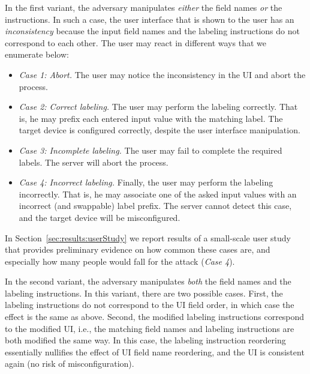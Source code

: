 \label{sec:securityAnalysis_IK:cases}
In the first variant, the adversary manipulates \emph{either} the field names \emph{or} the instructions. In such a case, the user interface that is shown to the user has an \emph{inconsistency} because the input field names and the labeling instructions do not correspond to each other. The user may react in different ways that we enumerate below:
\begin{itemize}
    \item \emph{Case 1: Abort.} The user may notice the inconsistency in the UI and abort the process. \label{detect}
    
    \item \emph{Case 2: Correct labeling.} The user may perform the labeling correctly. That is, he may prefix each entered input value with the matching label. The target device is configured correctly, despite the user interface manipulation.\label{notdetect}
    
    
    \item \emph{Case 3: Incomplete labeling.} The user may fail to complete the required labels. The server will abort the process. 
    
    \item \emph{Case 4: Incorrect labeling.} Finally, the user may perform the labeling incorrectly. That is, he may associate one of the asked input values with an incorrect (and swappable) label prefix. The server cannot detect this case, and the target device will be misconfigured. \label{kaboom}
\end{itemize}

In Section~\ref{sec:results:userStudy} we report results of a small-scale user study that provides preliminary evidence on how common these cases are, and especially how many people would fall for the attack (\emph{Case 4}).


In the second variant, the adversary manipulates \emph{both} the field names and the labeling instructions. In this variant, there are two possible cases. First, the labeling instructions do not correspond to the UI field order, in which case the effect is the same as above. Second, the modified labeling instructions correspond to the modified UI, i.e., the matching field names and labeling instructions are both modified the same way. In this case, the labeling instruction reordering essentially nullifies the effect of UI field name reordering, and the UI is consistent again (no risk of misconfiguration).


